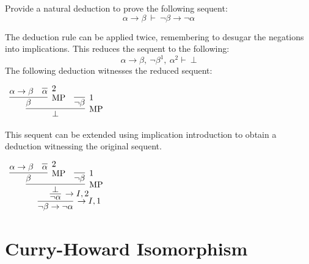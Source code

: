 \documentclass{book}
\begin{document}
    \begin{eg}[Contraposition]
        Provide a natural deduction to prove the following sequent: $$\alpha \to \beta \ \vdash \ \lnot\beta \to \lnot\alpha $$

        The deduction rule can be applied twice, remembering to desugar the negations into implications. This reduces the sequent to the following: $$\alpha \to \beta, \ \lnot\beta^{1}, \ \alpha^{2} \vdash \ \bot$$ The following deduction witnesses the reduced sequent: 

        \begin{center}
            $\begin{array}{c}
                \infer[\MP]{\bot}
                            {\infer[\MP]{\beta}
                                {\alpha \to \beta
                                &
                                \infer[2]{\alpha}{}}
                            &
                            \infer[1]{\lnot\beta}{}}
            \end{array}$
        \end{center}   
        
        This sequent can be extended using implication introduction to obtain a deduction witnessing the original sequent. 

        \begin{center}
            $\begin{array}{c}
                \infer[\to I,1]{\lnot\beta \to \lnot\alpha}
                    {\infer[\to I,2]{\lnot\alpha}
                        {\infer[\MP]{\bot}
                            {\infer[\MP]{\beta}
                                {\alpha \to \beta
                                &
                                \infer[2]{\alpha}{}}
                            &
                            \infer[1]{\lnot\beta}{}}}}
            \end{array}$
        \end{center}
    \end{eg}

    \newpage
    \section{Curry-Howard Isomorphism}
\end{document}
